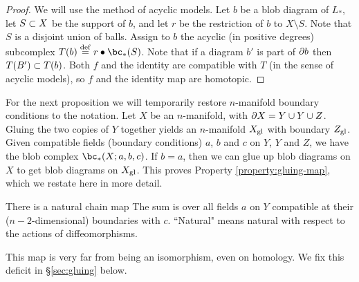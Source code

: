 \begin{proof}
We will use the method of acyclic models.
Let $b$ be a blob diagram of $L_*$, let $S\subset X$ be the support of $b$, and let
$r$ be the restriction of $b$ to $X\setminus S$.
Note that $S$ is a disjoint union of balls.
Assign to $b$ the acyclic (in positive degrees) subcomplex $T(b) \deq r\bullet\bc_*(S)$.
Note that if a diagram $b'$ is part of $\partial b$ then $T(B') \subset T(b)$.
Both $f$ and the identity are compatible with $T$ (in the sense of acyclic models), 
so $f$ and the identity map are homotopic. 
\end{proof}

For the next proposition we will temporarily restore $n$-manifold boundary
conditions to the notation. Let $X$ be an $n$-manifold, with $\partial X = Y \cup Y \cup Z$.
Gluing the two copies of $Y$ together yields an $n$-manifold $X_\mathrm{gl}$
with boundary $Z_\mathrm{gl}$.
Given compatible fields (boundary conditions) $a$, $b$ and $c$ on $Y$, $Y$ and $Z$,
we have the blob complex $\bc_*(X; a, b, c)$.
If $b = a$, then we can glue up blob diagrams on
$X$ to get blob diagrams on $X_\mathrm{gl}$.
This proves Property \ref{property:gluing-map}, which we restate here in more detail.

\begin{prop} \label{blob-gluing}
There is a natural chain map
The sum is over all fields $a$ on $Y$ compatible at their
($n{-}2$-dimensional) boundaries with $c$.
``Natural" means natural with respect to the actions of diffeomorphisms.
\end{prop}

This map is very far from being an isomorphism, even on homology.
We fix this deficit in \S\ref{sec:gluing} below.
